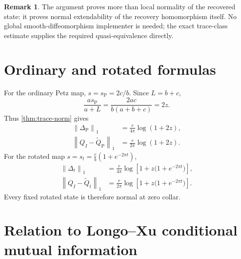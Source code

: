 \documentclass[11pt]{article}
\theoremstyle{accent}
\theoremstyle{definition}
\newtheorem{remark}[theorem]{Remark}
\newcommand{\norm}[1]{\left\lVert #1\right\rVert}
\begin{document}
\begin{remark}
The argument proves more than local normality of the recovered state: it proves normal extendability of the recovery homomorphism itself.  No global smooth-diffeomorphism implementer is needed; the exact trace-class estimate supplies the required quasi-equivalence directly.
\end{remark}

\section{Ordinary and rotated formulas}

For the ordinary Petz map, \(s=s_{\mathrm P}=2c/b\).  Since \(L=b+c\),
\[
 \frac{as_{\mathrm P}}{a+L}
 =\frac{2ac}{b(a+b+c)}=2z.
\]
Thus \cref{thm:trace-norm} gives
\begin{align}
 \norm{\Delta_{\mathrm P}}_1
 &=\frac{r}{4\pi}\log(1+2z),
 \label{eq:ordinary-cross}\\
 \norm{Q_I-\widetilde Q_{\mathrm P}}_1
 &=\frac{r}{2\pi}\log(1+2z).
 \label{eq:ordinary-full}
\end{align}
For the rotated map \(s=s_t=\frac cb(1+e^{-2\pi t})\),
\begin{align}
 \norm{\Delta_t}_1
 &=\frac{r}{4\pi}
 \log\!\left[1+z\bigl(1+e^{-2\pi t}\bigr)\right],
 \label{eq:rotated-cross}\\
 \norm{Q_I-\widetilde Q_t}_1
 &=\frac{r}{2\pi}
 \log\!\left[1+z\bigl(1+e^{-2\pi t}\bigr)\right].
 \label{eq:rotated-full}
\end{align}
Every fixed rotated state is therefore normal at zero collar.

\section{Relation to Longo--Xu conditional mutual information}
\end{document}
